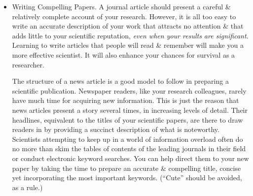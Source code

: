 \documentclass{article}
\begin{document}
\begin{enumerate}
\begin{itemize}
\begin{itemize}
			Writing a paper that presents 1 new idea or result is much easier than writing a long, complex article. This is a reasonable way to address the problem of writer's block. Much of the introduction to a shorter paper can be prepared, at least mentally, when the long-term research project is originally proposed. The organization of a paper is simpler if there is not so much material to present, \& it is also relatively easy to explain the conclusions in that case.

			Referees are generally busy people \& prefer to review short papers. You are likely to receive a more thoughtful \& positive report on a short manuscript than on a long one. Shorter papers are of course not only easier on referees. They also can be read \& assimilated more easily by the scientific community at large.

			Writing up individual kernels of new research should have some appeal for the perfectionist. It is easier to get everything right when one is dealing with a small project than when publishing the results of a major, complex effort.

			Eventually, of course, all the significant details of a research project need to be reported in an archival journal so that others may repeat \& confirm the validity of the new science. Writing such technical papers is an important exercise, \& one that will win you credit from your peers if you do it well. On the other hand, in most cases the writing of such papers can be carried out at leisure.
			\item {\sf Writing Compelling Papers.} A journal article should present a careful \& relatively complete account of your research. However, it is all too easy to write an accurate description of your work that attracts no attention \& that adds little to your scientific reputation, \textit{even when your results are significant}. Learning to write articles that people will read \& remember will make you a more effective scientist. It will also enhance your chances for survival as a researcher.

			The structure of a news article is a good model to follow in preparing a scientific publication. Newspaper readers, like your research colleagues, rarely have much time for acquiring new information. This is just the reason that news articles present a story several times, in increasing levels of detail. Their headlines, equivalent to the titles of your scientific papers, are there to draw readers in by providing a succinct description of what is noteworthy. Scientists attempting to keep up in a world of information overload often do no more than skim the tables of contents of the leading journals in their field or conduct electronic keyword searches. You can help direct them to your new paper by taking the time to prepare an accurate \& compelling title, concise yet incorporating the most important keywords. (``Cute'' should be avoided, as a rule.)


\end{itemize}
\end{itemize}
\end{enumerate}
\end{document}
